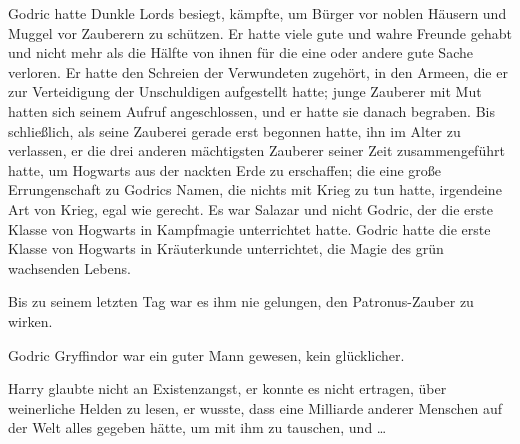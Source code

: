 Godric hatte Dunkle Lords besiegt, kämpfte, um Bürger vor noblen Häusern und Muggel vor Zauberern zu schützen. Er hatte viele gute und wahre Freunde gehabt und nicht mehr als die Hälfte von ihnen für die eine oder andere gute Sache verloren. Er hatte den Schreien der Verwundeten zugehört, in den Armeen, die er zur Verteidigung der Unschuldigen aufgestellt hatte; junge Zauberer mit Mut hatten sich seinem Aufruf angeschlossen, und er hatte sie danach begraben. Bis schließlich, als seine Zauberei gerade erst begonnen hatte, ihn im Alter zu verlassen, er die drei anderen mächtigsten Zauberer seiner Zeit zusammengeführt hatte, um Hogwarts aus der nackten Erde zu erschaffen; die eine große Errungenschaft zu Godrics Namen, die nichts mit Krieg zu tun hatte, irgendeine Art von Krieg, egal wie gerecht. Es war Salazar und nicht Godric, der die erste Klasse von Hogwarts in Kampfmagie unterrichtet hatte. Godric hatte die erste Klasse von Hogwarts in Kräuterkunde unterrichtet, die Magie des grün wachsenden Lebens.

Bis zu seinem letzten Tag war es ihm nie gelungen, den Patronus-Zauber zu wirken.

Godric Gryffindor war ein guter Mann gewesen, kein glücklicher.

Harry glaubte nicht an Existenzangst, er konnte es nicht ertragen, über weinerliche Helden zu lesen, er wusste, dass eine Milliarde anderer Menschen auf der Welt alles gegeben hätte, um mit ihm zu tauschen, und …


